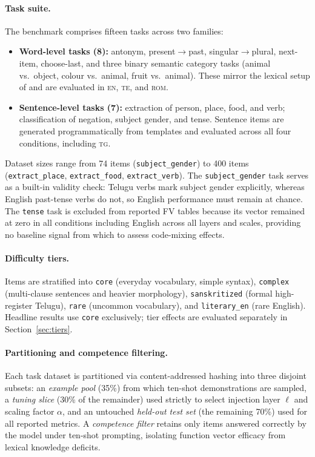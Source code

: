 \documentclass[11pt]{article}
\newcommand{\cond}[1]{\textsc{#1}}
\begin{document}
\paragraph{Task suite.}
The benchmark comprises fifteen tasks across two families:
\begin{itemize}
  \item \textbf{Word-level tasks (8):} antonym, present$\to$past,
    singular$\to$plural, next-item, choose-last, and three binary semantic
    category tasks (animal vs.\ object, colour vs.\ animal, fruit vs.\ animal).
    These mirror the lexical setup of \citet{todd2024function} and are
    evaluated in \cond{en}, \cond{te}, and \cond{rom}.
  \item \textbf{Sentence-level tasks (7):} extraction of person, place, food,
    and verb; classification of negation, subject gender, and tense. Sentence
    items are generated programmatically from templates and evaluated across
    all four conditions, including \cond{tg}.
\end{itemize}
Dataset sizes range from 74 items (\texttt{subject\_gender}) to 400 items
(\texttt{extract\_place}, \texttt{extract\_food}, \texttt{extract\_verb}).
The \texttt{subject\_gender} task serves as a built-in validity check: Telugu
verbs mark subject gender explicitly, whereas English past-tense verbs do not,
so English performance must remain at chance. The \texttt{tense} task is
excluded from reported FV tables because its vector remained at zero in all
conditions including English across all layers and scales, providing no
baseline signal from which to assess code-mixing effects.

\paragraph{Difficulty tiers.}
Items are stratified into \texttt{core} (everyday vocabulary, simple syntax),
\texttt{complex} (multi-clause sentences and heavier morphology),
\texttt{sanskritized} (formal high-register Telugu), \texttt{rare} (uncommon
vocabulary), and \texttt{literary\_en} (rare English). Headline results use
\texttt{core} exclusively; tier effects are evaluated separately in
Section~\ref{sec:tiers}.

\paragraph{Partitioning and competence filtering.}
Each task dataset is partitioned via content-addressed hashing into three
disjoint subsets: an \emph{example pool} (35\%) from which ten-shot
demonstrations are sampled, a \emph{tuning slice} (30\% of the remainder) used
strictly to select injection layer $\ell$ and scaling factor $\alpha$, and an
untouched \emph{held-out test set} (the remaining 70\%) used for all reported
metrics. A \emph{competence filter} retains only items answered correctly by
the model under ten-shot prompting, isolating function vector efficacy from
lexical knowledge deficits.
\end{document}
